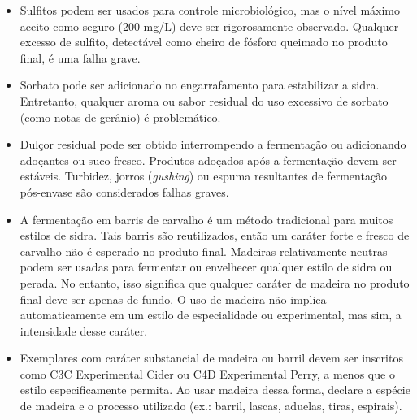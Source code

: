 \begin{itemize}
\item Sulfitos podem ser usados para controle microbiológico, mas o nível máximo aceito como seguro (200 mg/L) deve ser rigorosamente observado. Qualquer excesso de sulfito, detectável como cheiro de fósforo queimado no produto final, é uma falha grave.
\item Sorbato pode ser adicionado no engarrafamento para estabilizar a sidra. Entretanto, qualquer aroma ou sabor residual do uso excessivo de sorbato (como notas de gerânio) é problemático.
\item Dulçor residual pode ser obtido interrompendo a fermentação ou adicionando adoçantes ou suco fresco. Produtos adoçados após a fermentação devem ser estáveis. Turbidez, jorros (\textit{gushing}) ou espuma resultantes de fermentação pós-envase são considerados falhas graves.
\item A fermentação em barris de carvalho é um método tradicional para muitos estilos de sidra. Tais barris são reutilizados, então um caráter forte e fresco de carvalho não é esperado no produto final. Madeiras relativamente neutras podem ser usadas para fermentar ou envelhecer qualquer estilo de sidra ou perada. No entanto, isso significa que qualquer caráter de madeira no produto final deve ser apenas de fundo. O uso de madeira não implica automaticamente em um estilo de especialidade ou experimental, mas sim, a intensidade desse caráter.
\item Exemplares com caráter substancial de madeira ou barril devem ser inscritos como C3C Experimental Cider ou C4D Experimental Perry, a menos que o estilo especificamente permita. Ao usar madeira dessa forma, declare a espécie de madeira e o processo utilizado (ex.: barril, lascas, aduelas, tiras, espirais).
\end{itemize}
